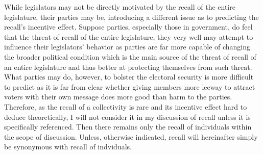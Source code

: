 \documentclass[hyphens, crop=false]{standalone}
\begin{document}
		While legislators may not be directly motivated by the recall of the entire legislature,
		their parties may be, introducing a different issue as to predicting the recall's incentive effect.
		Suppose parties, especially those in government, do feel that the threat of recall of the entire legislature,
		they very well may attempt to influence their legislators' behavior
		as parties
		are far more capable of changing the broader political condition
		which is the main source of the threat of recall of an entire legislature and thus better at
		protecting themselves from such threat.
		What parties may do, however,
		to bolster the electoral security is more difficult to predict as it is far from clear whether giving members
		more leeway to attract voters with their own message does more good than harm to the parties.
		Therefore, as the recall of a collectivity is rare and its incentive effect hard to deduce theoretically,
		I will not consider it in my discussion of recall unless it is specifically referenced.
		Then there remains only the recall of individuals within the scope of discussion.
		Unless, otherwise indicated, recall will hereinafter simply be synonymous with recall of indviduals.
		
\end{document}
